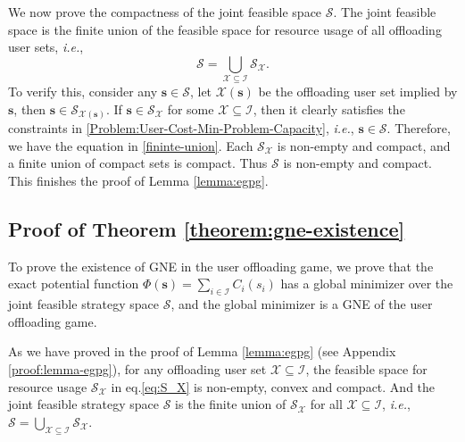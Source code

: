 \documentclass[lettersize,journal]{IEEEtran}
\newcommand{\ie}{\emph{i.e.}}
\begin{document}
We now prove the compactness of the joint feasible space $\mathcal{S}$. The joint feasible space is the finite union of the feasible space for resource usage of all offloading user sets, \ie,
\begin{equation}\label{fininte-union}
    \mathcal{S}=\bigcup_{\mathcal{X}\subseteq\mathcal{I}}\mathcal{S}_{\mathcal{X}}.
\end{equation}
To verify this, consider any $\boldsymbol{s}\in\mathcal{S}$, let $\mathcal{X}(\boldsymbol{s})$ be the offloading user set implied by $\boldsymbol{s}$, then $\boldsymbol{s}\in\mathcal{S}_{\mathcal{X}(\boldsymbol{s})}$. If $\boldsymbol{s}\in\mathcal{S}_{\mathcal{X}}$ for some $\mathcal{X}\subseteq\mathcal{I}$, then it clearly satisfies the constraints in \eqref{Problem:User-Cost-Min-Problem-Capacity}, \ie, $\boldsymbol{s}\in\mathcal{S}$. Therefore, we have the equation in \eqref{fininte-union}. Each $\mathcal{S}_{\mathcal{X}}$ is non-empty and compact, and a finite union of compact sets is compact. Thus $\mathcal{S}$ is non-empty and compact. This finishes the proof of Lemma \ref{lemma:egpg}.

\subsection{Proof of Theorem \ref{theorem:gne-existence}}\label{proof:theorem-gne-existence}
To prove the existence of GNE in the user offloading game, we prove that the exact potential function $\Phi(\boldsymbol{s})=\sum_{i\in\mathcal{I}}C_i(s_i)$ has a global minimizer over the joint feasible strategy space $\mathcal{S}$, and the global minimizer is a GNE of the user offloading game.

As we have proved in the proof of Lemma \ref{lemma:egpg} (see Appendix \ref{proof:lemma-egpg}), for any offloading user set $\mathcal{X}\subseteq\mathcal{I}$, the feasible space for resource usage $\mathcal{S}_{\mathcal{X}}$ in eq.\eqref{eq:S_X} is non-empty, convex and compact. And the joint feasible strategy space $\mathcal{S}$ is the finite union of $\mathcal{S}_{\mathcal{X}}$ for all $\mathcal{X}\subseteq\mathcal{I}$, \ie, $\mathcal{S}=\bigcup_{\mathcal{X}\subseteq\mathcal{I}}\mathcal{S}_{\mathcal{X}}$. 
\end{document}
